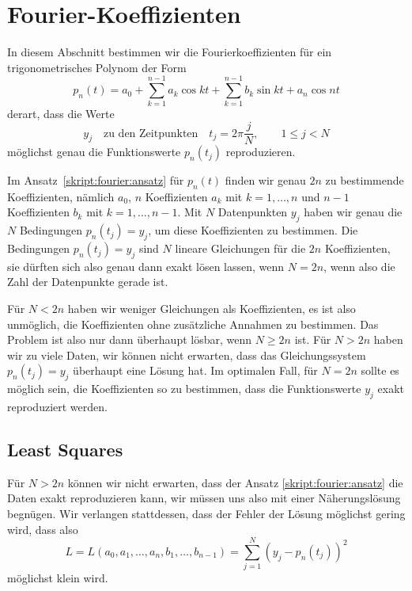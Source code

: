 %
%
%
\section{Fourier-Koeffizienten}
In diesem Abschnitt bestimmen wir die Fourierkoeffizienten für ein
trigonometrisches Polynom der Form
\begin{equation}
p_n(t)
=
a_0 + \sum_{k=1}^{n-1} a_k\cos kt + \sum_{k=1}^{n-1} b_k\sin kt + a_n\cos nt
\label{skript:fourier:ansatz}
\end{equation}
derart, dass die Werte
\begin{equation}
y_j \quad\text{zu den Zeitpunkten}\quad t_j=2\pi\frac{j}{N},\qquad 1\le j< N
\label{skript:fourier:gleichungen}
\end{equation}
möglichst genau die Funktionswerte $p_n(t_j)$ reproduzieren.

Im Ansatz~\eqref{skript:fourier:ansatz} für $p_n(t)$ finden wir
genau $2n$ zu bestimmende Koeffizienten, nämlich $a_0$,
$n$ Koeffizienten $a_k$ mit $k=1,\dots,n$
und $n-1$ Koeffizienten $b_k$ mit $k=1,\dots,n-1$.
Mit $N$ Datenpunkten $y_j$ haben wir genau die $N$ Bedingungen
$p_n(t_j)=y_j$, um diese Koeffizienten zu bestimmen.
Die Bedingungen $p_n(t_j)=y_j$ sind $N$ lineare Gleichungen für die
$2n$ Koeffizienten, sie dürften sich also genau dann exakt lösen
lassen, wenn $N=2n$, wenn also die Zahl der Datenpunkte gerade ist.

Für $N<2n$ haben wir weniger Gleichungen als Koeffizienten, es ist
also unmöglich, die Koeffizienten ohne zusätzliche Annahmen zu bestimmen.
Das Problem ist also nur dann überhaupt lösbar, wenn $N\ge 2n$ ist.
Für $N>2n$ haben wir zu viele Daten, wir können nicht erwarten, dass
das Gleichungssystem $p_n(t_j)=y_j$ überhaupt eine Lösung hat.
Im optimalen Fall, für $N=2n$ sollte es möglich sein, die Koeffizienten so
zu bestimmen, dass die Funktionswerte $y_j$ exakt reproduziert werden.

\subsection{Least Squares}
Für $N>2n$ können wir nicht erwarten, dass der Ansatz
\eqref{skript:fourier:ansatz} die Daten exakt reproduzieren kann,
wir müssen uns also mit einer Näherungslösung begnügen.
Wir verlangen stattdessen, dass der Fehler der Lösung möglichst gering
wird, dass also
\[
L=L(a_0,a_1,\dots,a_n,b_1,\dots,b_{n-1})= \sum_{j=1}^N (y_j - p_n(t_j))^2
\]
möglichst klein wird.

